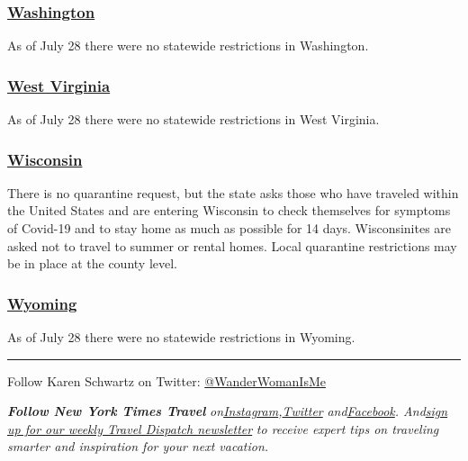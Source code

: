 \hypertarget{washington}{%
\subsubsection{\texorpdfstring{\href{https://www.experiencewa.com/articles/date-coronavirus-travel-advisory}{Washington}}{Washington}}\label{washington}}

As of July 28 there were no statewide restrictions in Washington.

\hypertarget{west-virginia}{%
\subsubsection{\texorpdfstring{\href{https://wvtourism.com/travel-alert/}{West
Virginia}}{West Virginia}}\label{west-virginia}}

As of July 28 there were no statewide restrictions in West Virginia.

\hypertarget{wisconsin}{%
\subsubsection{\texorpdfstring{\href{https://www.dhs.wisconsin.gov/covid-19/travel.htm}{Wisconsin}}{Wisconsin}}\label{wisconsin}}

There is no quarantine request, but the state asks those who have
traveled within the United States and are entering Wisconsin to check
themselves for symptoms of Covid-19 and to stay home as much as possible
for 14 days. Wisconsinites are asked not to travel to summer or rental
homes. Local quarantine restrictions may be in place at the county
level.

\hypertarget{wyoming}{%
\subsubsection{\texorpdfstring{\href{https://health.wyo.gov/publichealth/infectious-disease-epidemiology-unit/disease/novel-coronavirus/covid-19-orders-and-guidance/}{Wyoming}}{Wyoming}}\label{wyoming}}

As of July 28 there were no statewide restrictions in Wyoming.

\begin{center}\rule{0.5\linewidth}{\linethickness}\end{center}

Follow Karen Schwartz on Twitter:
\href{https://twitter.com/wanderwomanisme?lang=en}{@WanderWomanIsMe}

\emph{\textbf{Follow New York Times Travel}}
\emph{on}\href{https://www.instagram.com/nytimestravel/}{\emph{Instagram}}\emph{,}\href{https://twitter.com/nytimestravel}{\emph{Twitter}}
\emph{and}\href{https://www.facebook.com/nytimestravel/}{\emph{Facebook}}\emph{.
And}\href{https://www.nytimes.com/newsletters/traveldispatch}{\emph{sign
up for our weekly Travel Dispatch newsletter}} \emph{to receive expert
tips on traveling smarter and inspiration for your next vacation.}

